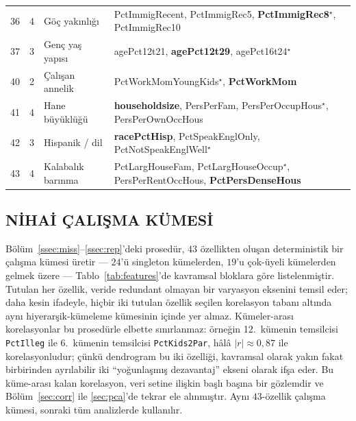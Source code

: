 \documentclass{ieeeaccess}
\begin{document}
\begin{table}[!t]
\begin{tabular}{cclp{7.6cm}}
36 &  4 & Göç yakınlığı                 & PctImmigRecent, PctImmigRec5, \textbf{PctImmigRec8}$^\star$, PctImmigRec10 \\
37 &  3 & Genç yaş yapısı               & agePct12t21, \textbf{agePct12t29}, agePct16t24$^\star$ \\
40 &  2 & Çalışan annelik               & PctWorkMomYoungKids$^\star$, \textbf{PctWorkMom} \\
41 &  4 & Hane büyüklüğü                & \textbf{householdsize}, PersPerFam, PersPerOccupHous$^\star$, PersPerOwnOccHous \\
42 &  3 & Hispanik / dil                & \textbf{racePctHisp}, PctSpeakEnglOnly, PctNotSpeakEnglWell$^\star$ \\
43 &  4 & Kalabalık barınma             & PctLargHouseFam, PctLargHouseOccup$^\star$, PersPerRentOccHous, \textbf{PctPersDenseHous} \\
\bottomrule
\end{tabular}
\end{table}

\subsection{NİHAİ ÇALIŞMA KÜMESİ}
\label{ssec:final}
Bölüm~\ref{ssec:miss}--\ref{ssec:rep}'deki prosedür, $43$ özellikten oluşan deterministik bir çalışma kümesi üretir --- $24$'ü singleton kümelerden, $19$'u çok-üyeli kümelerden gelmek üzere --- Tablo~\ref{tab:features}'de kavramsal bloklara göre listelenmiştir. Tutulan her özellik, veride redundant olmayan bir varyasyon eksenini temsil eder; daha kesin ifadeyle, hiçbir iki tutulan özellik seçilen korelasyon tabanı altında aynı hiyerarşik-kümeleme kümesinin içinde yer almaz. Kümeler-arası korelasyonlar bu prosedürle elbette sınırlanmaz: örneğin 12.\ kümenin temsilcisi \texttt{PctIlleg} ile 6.\ kümenin temsilcisi \texttt{PctKids2Par}, hâlâ $|r|\approx 0{,}87$ ile korelasyonludur; çünkü dendrogram bu iki özelliği, kavramsal olarak yakın fakat birbirinden ayrılabilir iki ``yoğunlaşmış dezavantaj'' ekseni olarak ifşa eder. Bu küme-arası kalan korelasyon, veri setine ilişkin başlı başına bir gözlemdir ve Bölüm~\ref{sec:corr} ile \ref{sec:pca}'de tekrar ele alınmıştır. Aynı $43$-özellik çalışma kümesi, sonraki tüm analizlerde kullanılır.
\end{document}
